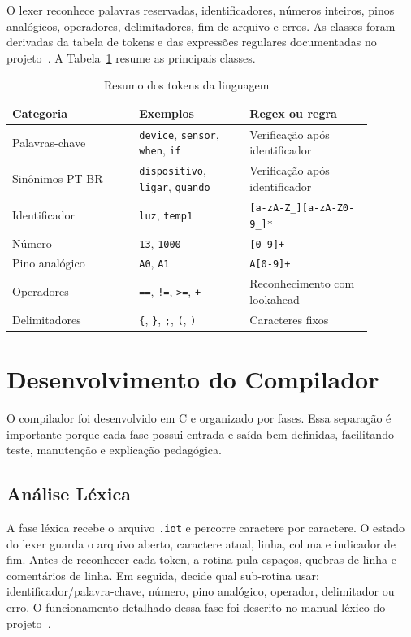 \documentclass[conference]{IEEEtran}
\begin{document}
O lexer reconhece palavras reservadas, identificadores, números inteiros, pinos analógicos, operadores, delimitadores, fim de arquivo e erros. As classes foram derivadas da tabela de tokens e das expressões regulares documentadas no projeto~\cite{docs-tokens}. A Tabela~\ref{tab:tokens} resume as principais classes.

\begin{table}[htbp]
\caption{Resumo dos tokens da linguagem}
\label{tab:tokens}
\centering
\begin{tabular}{p{0.31\linewidth}p{0.27\linewidth}p{0.3\linewidth}}
\toprule
\textbf{Categoria} & \textbf{Exemplos} & \textbf{Regex ou regra} \\
\midrule
Palavras-chave & \texttt{device}, \texttt{sensor}, \texttt{when}, \texttt{if} & Verificação após identificador \\
Sinônimos PT-BR & \texttt{dispositivo}, \texttt{ligar}, \texttt{quando} & Verificação após identificador \\
Identificador & \texttt{luz}, \texttt{temp1} & \texttt{[a-zA-Z\_][a-zA-Z0-9\_]*} \\
Número & \texttt{13}, \texttt{1000} & \texttt{[0-9]+} \\
Pino analógico & \texttt{A0}, \texttt{A1} & \texttt{A[0-9]+} \\
Operadores & \texttt{==}, \texttt{!=}, \texttt{>=}, \texttt{+} & Reconhecimento com lookahead \\
Delimitadores & \texttt{\{}, \texttt{\}}, \texttt{;}, \texttt{(}, \texttt{)} & Caracteres fixos \\
\bottomrule
\end{tabular}
\end{table}

\section{Desenvolvimento do Compilador}

O compilador foi desenvolvido em C e organizado por fases. Essa separação é importante porque cada fase possui entrada e saída bem definidas, facilitando teste, manutenção e explicação pedagógica.

\subsection{Análise Léxica}

A fase léxica recebe o arquivo \texttt{.iot} e percorre caractere por caractere. O estado do lexer guarda o arquivo aberto, caractere atual, linha, coluna e indicador de fim. Antes de reconhecer cada token, a rotina pula espaços, quebras de linha e comentários de linha. Em seguida, decide qual sub-rotina usar: identificador/palavra-chave, número, pino analógico, operador, delimitador ou erro. O funcionamento detalhado dessa fase foi descrito no manual léxico do projeto~\cite{docs-lex}.
\end{document}

